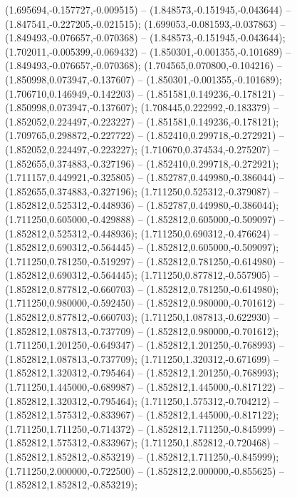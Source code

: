  (1.695694,-0.157727,-0.009515) -- (1.848573,-0.151945,-0.043644) -- (1.847541,-0.227205,-0.021515);
 (1.699053,-0.081593,-0.037863) -- (1.849493,-0.076657,-0.070368) -- (1.848573,-0.151945,-0.043644);
 (1.702011,-0.005399,-0.069432) -- (1.850301,-0.001355,-0.101689) -- (1.849493,-0.076657,-0.070368);
 (1.704565,0.070800,-0.104216) -- (1.850998,0.073947,-0.137607) -- (1.850301,-0.001355,-0.101689);
 (1.706710,0.146949,-0.142203) -- (1.851581,0.149236,-0.178121) -- (1.850998,0.073947,-0.137607);
 (1.708445,0.222992,-0.183379) -- (1.852052,0.224497,-0.223227) -- (1.851581,0.149236,-0.178121);
 (1.709765,0.298872,-0.227722) -- (1.852410,0.299718,-0.272921) -- (1.852052,0.224497,-0.223227);
 (1.710670,0.374534,-0.275207) -- (1.852655,0.374883,-0.327196) -- (1.852410,0.299718,-0.272921);
 (1.711157,0.449921,-0.325805) -- (1.852787,0.449980,-0.386044) -- (1.852655,0.374883,-0.327196);
 (1.711250,0.525312,-0.379087) -- (1.852812,0.525312,-0.448936) -- (1.852787,0.449980,-0.386044);
 (1.711250,0.605000,-0.429888) -- (1.852812,0.605000,-0.509097) -- (1.852812,0.525312,-0.448936);
 (1.711250,0.690312,-0.476624) -- (1.852812,0.690312,-0.564445) -- (1.852812,0.605000,-0.509097);
 (1.711250,0.781250,-0.519297) -- (1.852812,0.781250,-0.614980) -- (1.852812,0.690312,-0.564445);
 (1.711250,0.877812,-0.557905) -- (1.852812,0.877812,-0.660703) -- (1.852812,0.781250,-0.614980);
 (1.711250,0.980000,-0.592450) -- (1.852812,0.980000,-0.701612) -- (1.852812,0.877812,-0.660703);
 (1.711250,1.087813,-0.622930) -- (1.852812,1.087813,-0.737709) -- (1.852812,0.980000,-0.701612);
 (1.711250,1.201250,-0.649347) -- (1.852812,1.201250,-0.768993) -- (1.852812,1.087813,-0.737709);
 (1.711250,1.320312,-0.671699) -- (1.852812,1.320312,-0.795464) -- (1.852812,1.201250,-0.768993);
 (1.711250,1.445000,-0.689987) -- (1.852812,1.445000,-0.817122) -- (1.852812,1.320312,-0.795464);
 (1.711250,1.575312,-0.704212) -- (1.852812,1.575312,-0.833967) -- (1.852812,1.445000,-0.817122);
 (1.711250,1.711250,-0.714372) -- (1.852812,1.711250,-0.845999) -- (1.852812,1.575312,-0.833967);
 (1.711250,1.852812,-0.720468) -- (1.852812,1.852812,-0.853219) -- (1.852812,1.711250,-0.845999);
 (1.711250,2.000000,-0.722500) -- (1.852812,2.000000,-0.855625) -- (1.852812,1.852812,-0.853219);
